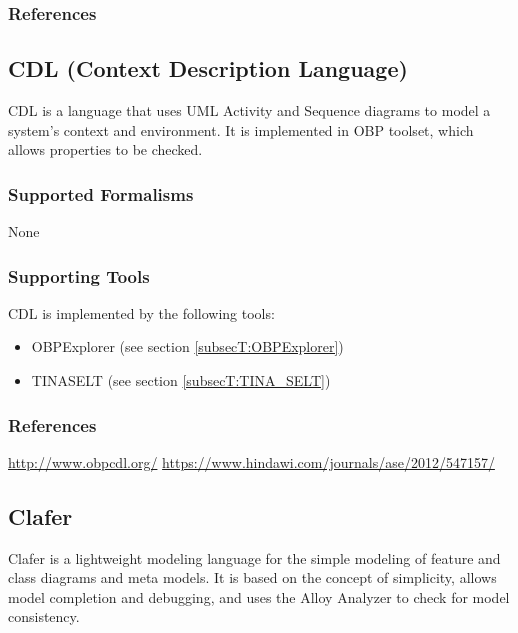 \subsubsection{References}





\subsection{CDL (Context Description Language)}
\label{subsecL:CDL}


CDL is a language that uses UML Activity and Sequence diagrams to model a system's context and environment.
It is implemented in OBP toolset, which allows properties to be checked.

\subsubsection{Supported Formalisms}

None


\subsubsection{Supporting Tools}

CDL is implemented by the following tools:
\begin{itemize}
	\item OBPExplorer (see section \ref{subsecT:OBPExplorer})
	\item TINA\textunderscore SELT (see section \ref{subsecT:TINA_SELT})
\end{itemize}


\subsubsection{References}

\url{http://www.obpcdl.org/}
\url{https://www.hindawi.com/journals/ase/2012/547157/}






\subsection{Clafer}
\label{subsecL:Clafer}

Clafer is a lightweight modeling language for the simple modeling of feature and class diagrams and meta models.
It is based on the concept of simplicity, allows model completion and debugging, and uses the Alloy Analyzer to check for model consistency.

